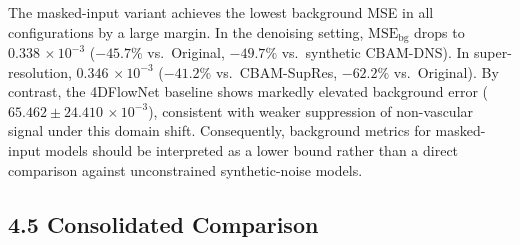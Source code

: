 \documentclass[11pt]{article}
\begin{document}
The masked-input variant achieves the lowest background MSE in all configurations by a large
margin. In the denoising setting, $\text{MSE}_{\text{bg}}$ drops to
$0.338\,{\times}10^{-3}$ ($-45.7\%$ vs.\ Original, $-49.7\%$ vs.\ synthetic CBAM-DNS). In
super-resolution, $0.346\,{\times}10^{-3}$ ($-41.2\%$ vs.\ CBAM-SupRes, $-62.2\%$ vs.\
Original). By contrast, the 4DFlowNet baseline shows markedly elevated background error
($65.462 \pm 24.410\,{\times}10^{-3}$), consistent with weaker suppression of non-vascular
signal under this domain shift. Consequently, background metrics for masked-input models
should be interpreted as a lower bound rather than a direct comparison against unconstrained
synthetic-noise models.

\subsection*{4.5 Consolidated Comparison}
\end{document}
